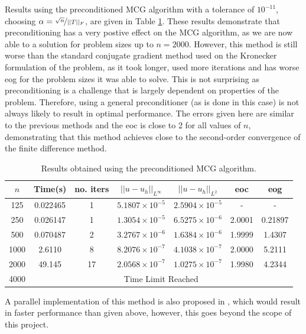 \documentclass[11pt]{article}
\numberwithin{equation}{section}
\begin{document}
Results using the preconditioned MCG algorithm with a tolerance of $10^{-11}$, choosing $\alpha = \nicefrac{\sqrt{n}}{||T||_F}$, are given in Table \ref{table:pre MCG}. These results demonstrate that preconditioning has a very postive effect on the MCG algorithm, as we are now able to a solution for problem sizes up to $n=2000$. However, this method is still worse than the standard conjugate gradient method used on the Kronecker formulation of the problem, as it took longer, used more iterations and has worse eog for the problem sizes it was able to solve. This is not surprising as preconditioning is a challenge that is largely dependent on properties of the problem. Therefore, using a general preconditioner (as is done in this case) is not always likely to result in optimal performance. The errors given here are similar to the previous methods and the eoc is close to 2 for all values of $n$, demonstrating that this method achieves close to the second-order convergence of the finite difference method.

\begin{table}[H]
\centering
\begin{tabular}{|c|c|c|c|c|c|c|}
\hline
$n$ & Time(s) & no. iters & $|| u - u_h ||_{L^{\infty}}$ &$|| u - u_h ||_{L^{2}}$ & eoc & eog \\
\hline
125 & 0.022465 & 1 & $5.1807 \times 10^{-5}$ & $2.5904 \times 10^{-5}$ & - & - \\
250 & 0.026147 & 1 & $1.3054 \times 10^{-5}$ & $6.5275 \times 10^{-6}$ & 2.0001 & 0.21897 \\
500 & 0.070487 & 2 & $3.2767 \times 10^{-6}$ & $1.6384 \times 10^{-6}$ & 1.9999 & 1.4307 \\
1000 & 2.6110 & 8 & $8.2076 \times 10^{-7}$ & $4.1038 \times 10^{-7}$ & 2.0000 & 5.2111 \\
2000 & 49.145 & 17 & $2.0568 \times 10^{-7}$ & $1.0275 \times 10^{-7}$ & 1.9980 & 4.2344 \\
\cline{2-7}
4000 & \multicolumn{6}{c|}{Time Limit Reached} \\
\hline
\end{tabular}
\captionsetup{justification=centering}
\caption{Results obtained using the preconditioned MCG algorithm.}
\label{table:pre MCG}
\end{table}

A parallel implementation of this method is also proposed in \cite{Hou}, which would result in faster performance than given above, however, this goes beyond the scope of this project.
\end{document}
